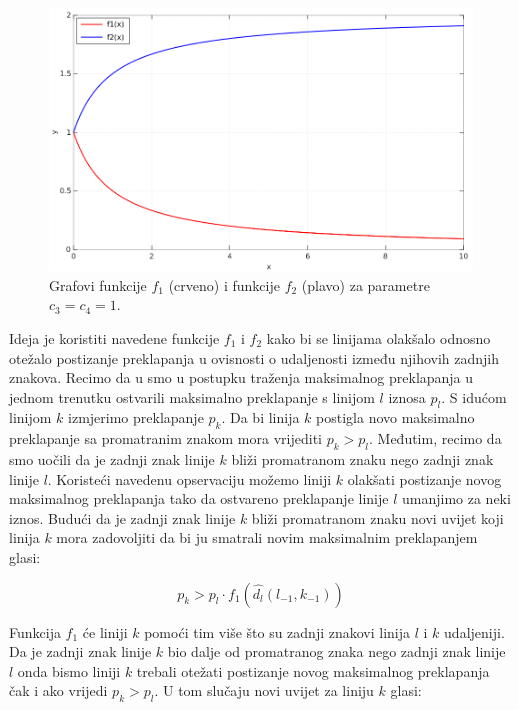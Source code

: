\documentclass[times, utf8, zavrsni]{fer}
\begin{document}
\begin{figure}[htb]
    \centering
    \captionsetup{justification=centering,margin=2cm}
    \includegraphics[width=\textwidth]{images/function-01.png}
    \caption{
        Grafovi funkcije $f_1$ (crveno) i funkcije $f_2$ (plavo) za parametre
        $c_3 = c_4 = 1$.
    }
    \label{fig:function-01}
\end{figure}

\pagebreak

Ideja je koristiti navedene funkcije $f_1$ i $f_2$ kako bi se linijama
olakšalo odnosno otežalo postizanje preklapanja u ovisnosti o udaljenosti između
njihovih zadnjih znakova. Recimo da u smo u postupku traženja maksimalnog
preklapanja u jednom trenutku ostvarili maksimalno preklapanje s linijom $l$
iznosa $p_l$. S idućom linijom $k$ izmjerimo preklapanje $p_k$. Da bi linija
$k$ postigla novo maksimalno preklapanje sa promatranim znakom mora vrijediti
$p_k > p_l$. Međutim, recimo da smo uočili da je zadnji znak linije $k$
bliži promatranom znaku nego zadnji znak linije $l$. Koristeći navedenu
opservaciju možemo liniji $k$ olakšati postizanje novog maksimalnog
preklapanja tako da ostvareno preklapanje linije $l$ umanjimo za neki iznos.
Budući da je zadnji znak linije $k$ bliži promatranom znaku novi uvijet koji
linija $k$ mora zadovoljiti da bi ju smatrali novim maksimalnim preklapanjem
glasi:

\begin{equation}
p_k > p_l \cdot f_1(\hat{d_l}(l_{-1},k_{-1}))
\end{equation}

Funkcija $f_1$ će liniji $k$ pomoći tim više što su zadnji znakovi linija
$l$ i $k$ udaljeniji. Da je zadnji znak linije $k$ bio dalje od
promatranog znaka nego zadnji znak linije $l$ onda bismo liniji $k$ trebali
otežati postizanje novog maksimalnog preklapanja čak i ako vrijedi $p_k > p_l$. U tom slučaju novi uvijet za liniju $k$ glasi:
\end{document}
